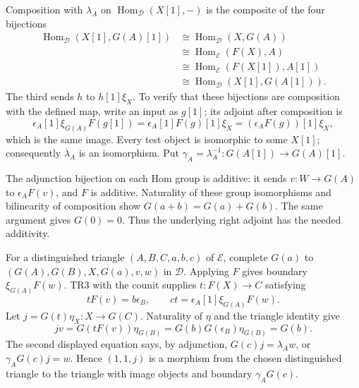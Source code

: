 \documentclass[11pt]{article}
\begin{document}
Composition with \(\lambda_A\) on \(\operatorname{Hom}_{\mathcal D}(X[1],-)\) is the composite of the four bijections \[
\begin{split}
\operatorname{Hom}_{\mathcal D}(X[1],G(A)[1])
&\cong\operatorname{Hom}_{\mathcal D}(X,G(A))\\
&\cong\operatorname{Hom}_{\mathcal E}(F(X),A)\\
&\cong\operatorname{Hom}_{\mathcal E}(F(X[1]),A[1])\\
&\cong\operatorname{Hom}_{\mathcal D}(X[1],G(A[1])).
\end{split}
\] The third sends \(h\) to \(h[1]\xi_X\). To verify that these bijections are composition with the defined map,\allowbreak{} write an input as \(g[1]\); its adjoint after composition is \[
\epsilon_A[1]\xi_{G(A)}F(g[1])
=\epsilon_A[1]F(g)[1]\xi_X
=(\epsilon_AF(g))[1]\xi_X,
\] which is the same image. Every test object is isomorphic to some \(X[1]\); consequently \(\lambda_A\) is an isomorphism. Put \(\gamma_A=\lambda_A^{-1}:G(A[1])\to G(A)[1]\).

The adjunction bijection on each Hom group is additive:\allowbreak{} it sends \(v:W\to G(A)\) to \(\epsilon_AF(v)\),\allowbreak{} and \(F\) is additive. Naturality of these group isomorphisms and bilinearity of composition show \(G(a+b)=G(a)+G(b)\). The same argument gives \(G(0)=0\). Thus the underlying right adjoint has the needed additivity.

For a distinguished triangle \((A,B,C,a,b,c)\) of \(\mathcal E\),\allowbreak{} complete \(G(a)\) to \((G(A),G(B),X,G(a),v,w)\) in \(\mathcal D\). Applying \(F\) gives boundary \(\xi_{G(A)}F(w)\). TR3 with the counit supplies \(t:F(X)\to C\) satisfying \[
tF(v)=b\epsilon_B,\qquad ct=\epsilon_A[1]\xi_{G(A)}F(w).
\] Let \(j=G(t)\eta_X:X\to G(C)\). Naturality of \(\eta\) and the triangle identity give \[
jv=G(tF(v))\eta_{G(B)}
=G(b)G(\epsilon_B)\eta_{G(B)}=G(b).
\] The second displayed equation says,\allowbreak{} by adjunction,\allowbreak{} \(G(c)j=\lambda_Aw\),\allowbreak{} or \(\gamma_AG(c)j=w\). Hence \((1,1,j)\) is a morphism from the chosen distinguished triangle to the triangle with image objects and boundary \(\gamma_AG(c)\).
\end{document}
